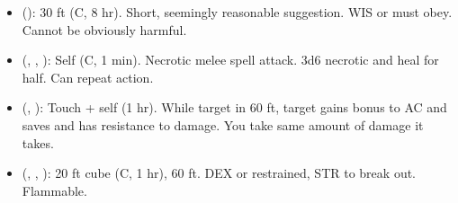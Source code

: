 \begin{itemize}
	\item {} (): 30 ft (C, 8 hr). Short, seemingly reasonable suggestion. WIS or must obey. Cannot be obviously harmful.
	\item {} (, , ): Self (C, 1 min). Necrotic melee spell attack. 3d6 necrotic and heal for half. Can repeat action.
	\item {} (, ): Touch + self (1 hr). While target in 60 ft, target gains bonus to AC and saves and has resistance to damage. You take same amount of damage it takes. 
	\item {} (, , ): 20 ft cube (C, 1 hr), 60 ft. DEX or restrained, STR to break out. Flammable.
\end{itemize}

